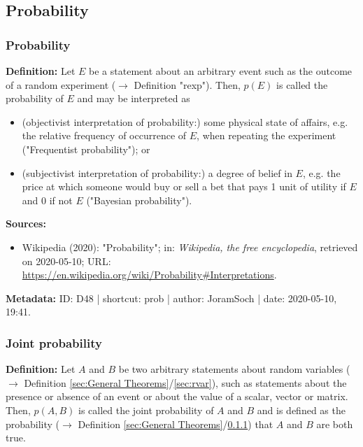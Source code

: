 \documentclass[a4paper,12pt,twoside]{book}
\begin{document}
\subsection{Probability}

\subsubsection[\textit{Probability}]{Probability} \label{sec:prob}
\setcounter{equation}{0}

\textbf{Definition:} Let $E$ be a statement about an arbitrary event such as the outcome of a random experiment ($\rightarrow$ Definition "rexp"). Then, $p(E)$ is called the probability of $E$ and may be interpreted as

\begin{itemize}

\item (objectivist interpretation of probability:) some physical state of affairs, e.g. the relative frequency of occurrence of $E$, when repeating the experiment ("Frequentist probability"); or

\item (subjectivist interpretation of probability:) a degree of belief in $E$, e.g. the price at which someone would buy or sell a bet that pays 1 unit of utility if $E$ and 0 if not $E$ ("Bayesian probability").

\end{itemize}


\vspace{1em}
\textbf{Sources:}
\begin{itemize}
\item Wikipedia (2020): "Probability"; in: \textit{Wikipedia, the free encyclopedia}, retrieved on 2020-05-10; URL: \url{https://en.wikipedia.org/wiki/Probability#Interpretations}.
\end{itemize}


\vspace{1em}
\textbf{Metadata:} ID: D48 | shortcut: prob | author: JoramSoch | date: 2020-05-10, 19:41.
\vspace{1em}



\subsubsection[\textit{Joint probability}]{Joint probability} \label{sec:prob-joint}
\setcounter{equation}{0}

\textbf{Definition:} Let $A$ and $B$ be two arbitrary statements about random variables ($\rightarrow$ Definition \ref{sec:General Theorems}/\ref{sec:rvar}), such as statements about the presence or absence of an event or about the value of a scalar, vector or matrix. Then, $p(A,B)$ is called the joint probability of $A$ and $B$ and is defined as the probability ($\rightarrow$ Definition \ref{sec:General Theorems}/\ref{sec:prob}) that $A$ and $B$ are both true.
\end{document}
